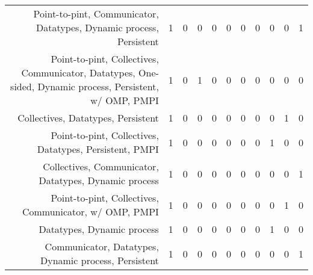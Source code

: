 {\begin{landscape}
\begin{longtable}[htb]{r|c|c|c|c|c|c|c|c|c|c}
{Point-to-pint, Communicator, Datatypes, Dynamic process, Persistent} & 1 & 0 & 0 & 0 & 0 & 0 & 0 & 0 & 0 & 1 \\%
{Point-to-pint, Collectives, Communicator, Datatypes, One-sided, Dynamic process, Persistent, w/ OMP, PMPI} & 1 & 0 & 1 & 0 & 0 & 0 & 0 & 0 & 0 & 0 \\%
{Collectives, Datatypes, Persistent} & 1 & 0 & 0 & 0 & 0 & 0 & 0 & 0 & 1 & 0 \\%
{Point-to-pint, Collectives, Datatypes, Persistent, PMPI} & 1 & 0 & 0 & 0 & 0 & 0 & 0 & 1 & 0 & 0 \\%
{Collectives, Communicator, Datatypes, Dynamic process} & 1 & 0 & 0 & 0 & 0 & 0 & 0 & 0 & 0 & 1 \\%
{Point-to-pint, Collectives, Communicator, w/ OMP, PMPI} & 1 & 0 & 0 & 0 & 0 & 0 & 0 & 0 & 1 & 0 \\%
{Datatypes, Dynamic process} & 1 & 0 & 0 & 0 & 0 & 0 & 0 & 1 & 0 & 0 \\%
{Communicator, Datatypes, Dynamic process, Persistent} & 1 & 0 & 0 & 0 & 0 & 0 & 0 & 0 & 0 & 1 \\%
\hline%
\end{longtable}%
\end{landscape}}%
\clearpage%
